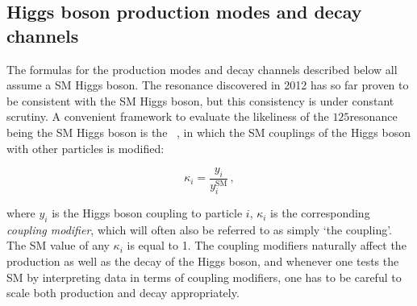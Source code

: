 \subsection{Higgs boson production modes and decay channels}
\label{sec:production-decay}

The formulas for the production modes and decay channels described below all assume a SM Higgs boson.
% 
The resonance discovered in 2012 has so far proven to be consistent with the SM Higgs boson, but this consistency is under constant scrutiny.
% 
A convenient framework to evaluate the likeliness of the $125$\GeV resonance being the SM Higgs boson is the \textit{\kappaframework}~\cite{LHCHXSWG:YR3}, in which the SM couplings of the Higgs boson with other particles is modified:
% 
\begin{linenomath*}
\begin{equation}
\kappa_{i} = \frac{y_{i}}{y_{i}^{\text{SM}}}\,,
\end{equation}
\end{linenomath*}
% 
where $y_i$ is the Higgs boson coupling to particle $i$, $\kappa_i$ is the corresponding \textit{coupling modifier}, which will often also be referred to as simply `the coupling'.
% 
The SM value of any $\kappa_i$ is equal to 1.
% 
The coupling modifiers naturally affect the production as well as the decay of the Higgs boson, and whenever one tests the SM by interpreting data in terms of coupling modifiers, one has to be careful to scale both production and decay appropriately.


